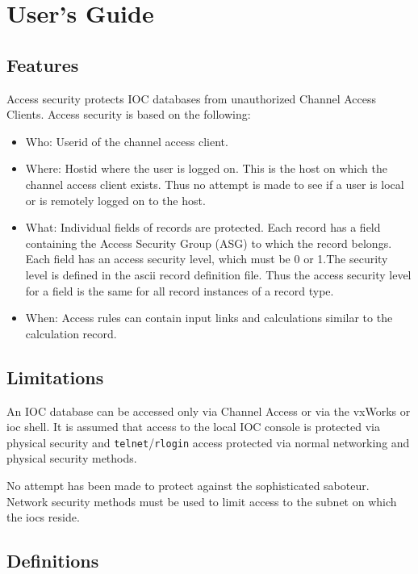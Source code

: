 \section{User's Guide}

\subsection{Features}

Access security protects IOC databases from unauthorized Channel Access Clients. Access security is based on the 
following:

\begin{itemize}\item Who:  Userid of the channel access client.

\item Where:  Hostid where the user is logged on. This is the host on which the channel access client exists. Thus no 
attempt is made to see if a user is local or is remotely logged on to the host.

\item What:  Individual fields of records are protected. Each record has a field containing the Access Security Group 
(ASG) to which the record belongs. Each field has an access security level, which must be 0 or 1.The security level 
is defined in the ascii record definition file. Thus the access security level for a field is the same for all record 
instances of a record type.

\item When:  Access rules can contain input links and calculations similar to the calculation record. 

\end{itemize}\subsection{Limitations}

An IOC database can be accessed only via Channel Access or via the vxWorks or ioc shell. It is assumed that access to the 
local IOC console is protected via physical security and \verb|telnet|/\verb|rlogin| access protected via normal networking and 
physical security methods.

No attempt has been made to protect against the sophisticated saboteur. Network security methods must be used to limit 
access to the subnet on which the iocs reside.

\subsection{Definitions}

